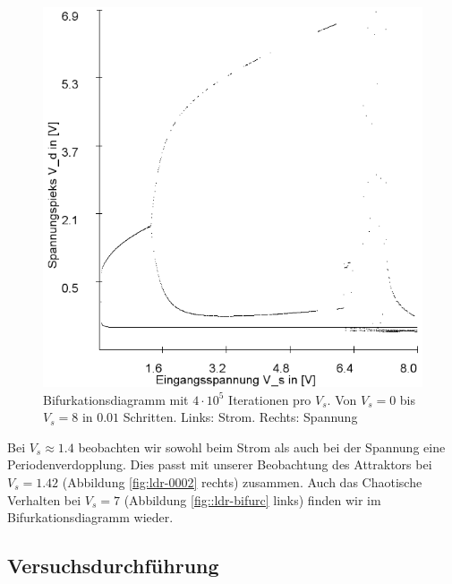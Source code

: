 \documentclass[11,5pt, twoside]{article}
\begin{document}
\begin{figure}[!htbp]
\includegraphics[scale=0.4]{schwing-bifurc-von-0-8-in-0,01schritten-400k-spannung}
\caption{Bifurkationsdiagramm mit $4\cdot10^5$ Iterationen pro $V_s$. Von $V_s=0$ bis $V_s=8$ in $0.01$ Schritten. Links: Strom. Rechts: Spannung}
\label{fig:ldr-bifurc}
\end{figure}
Bei $V_s\approx1.4$ beobachten wir sowohl beim Strom als auch bei der Spannung eine Periodenverdopplung. Dies passt mit unserer Beobachtung des Attraktors bei $V_s=1.42$ (Abbildung \ref{fig:ldr-0002} rechts) zusammen. Auch das Chaotische Verhalten bei $V_s=7$ (Abbildung \ref{fig::ldr-bifurc} links) finden wir im Bifurkationsdiagramm wieder.
\pagebreak
\subsection { Versuchsdurchführung }
\end{document}
